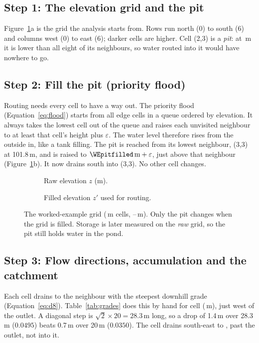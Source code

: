\documentclass[11pt,a4paper]{article}
\newcommand{\gen}[1]{}
\begin{document}
\subsection*{Step 1: The elevation grid and the pit}
Figure~\ref{fig:dem}a is the grid the analysis starts from. Rows run north (0) to south (6) and columns west (0) to east (6); darker cells are higher. Cell (2,3) is a \emph{pit}: at \WEpitz\,m it is lower than all eight of its neighbours, so water routed into it would have nowhere to go.

\subsection*{Step 2: Fill the pit (priority flood)}
Routing needs every cell to have a way out. The priority flood (Equation~\ref{eq:flood}) starts from all edge cells in a queue ordered by elevation. It always takes the lowest cell out of the queue and raises each unvisited neighbour to at least that cell's height plus $\varepsilon$. The water level therefore rises from the outside in, like a tank filling. The pit is reached from its lowest neighbour, (3,3) at 101.8\,m, and is raised to $\WEpitfilled\,\text{m}+\varepsilon$, just above that neighbour (Figure~\ref{fig:dem}b). It now drains south into (3,3). No other cell changes.

\begin{figure}[htbp]
\centering
\begin{subfigure}[t]{0.49\linewidth}\centering
{}
\caption{Raw elevation $z$ (m).}
\end{subfigure}\hfill
\begin{subfigure}[t]{0.49\linewidth}\centering
{}
\caption{Filled elevation $z'$ used for routing.}
\end{subfigure}
\caption{The worked-example grid (\WEcell\,m cells, \WElo--\WEhi\,m). Only the pit changes when the grid is filled. Storage is later measured on the \emph{raw} grid, so the pit still holds water in the pond.}
\label{fig:dem}
\end{figure}

\subsection*{Step 3: Flow directions, accumulation and the catchment}
Each cell drains to the neighbour with the steepest downhill grade (Equation~\ref{eq:d8}). Table~\ref{tab:grades} does this by hand for cell \WEprobe{} (\WEprobez\,m), just west of the outlet. A diagonal step is $\sqrt2\times20=28.3$\,m long, so a drop of 1.4\,m over 28.3\,m ($0.0495$) beats 0.7\,m over 20\,m ($0.0350$). The cell drains south-east to \WEprobeto{}, past the outlet, not into it.
\end{document}
